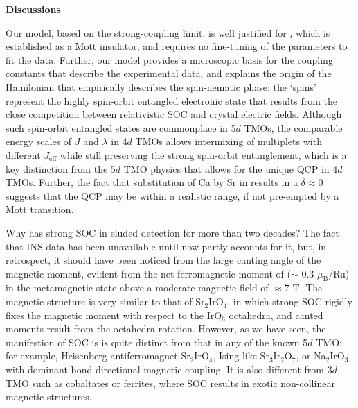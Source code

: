 \vspace{ 10 pt}
\noindent
{\bf Discussions}

\noindent
Our model, based on the strong-coupling limit, is well justified for \CROns, which is established as a Mott insulator, and requires no fine-tuning of the parameters to fit the data. Further, our model provides a microscopic basis for the coupling constants that describe the experimental data, and explains the origin of the Hamilonian that empirically describes the spin-nematic phase: the `spins' represent the highly spin-orbit entangled electronic state that results from the close competition between relativistic SOC and crystal electric fields. Although such spin-orbit entangled states are commonplace in 5$d$ TMOs, the comparable energy scales of $J$ and $\lambda$ in 4$d$ TMOs allows intermixing of multiplets with different $J_{\mathrm {eff}}$ while still preserving the strong spin-orbit entanglement, which is a key distinction from the 5$d$ TMO physics that allows for the unique QCP in 4$d$ TMOs. Further, the fact that substitution of Ca by Sr in \CRO results in a $\delta$$\approx$0 suggests that the QCP may be within a realistic range, if not pre-empted by a Mott transition.

Why has strong SOC in \CRO eluded detection for more than two decades? The fact that INS data has been unavailable until now partly accounts for it, but, in retrospect, it should have been noticed from the large canting angle of the magnetic moment, evident from the net ferromagnetic moment of ($\sim$ 0.3 $\mu_{\mathrm{B}}$/Ru) in the metamagnetic state above a moderate magnetic field of $\approx7$ T. The magnetic structure is very similar to that of Sr$_2$IrO$_4$, in which strong SOC rigidly fixes the magnetic moment with respect to the IrO$_6$ octahedra, and canted moments result from the octahedra rotation. However, as we have seen, the manifestion of SOC is \CRO is quite distinct from that in any of the known 5$d$ TMO; for example, Heisenberg antiferromagnet Sr$_2$IrO$_4$,  Ising-like Sr$_3$Ir$_2$O$_7$, or Na$_2$IrO$_3$ with dominant bond-directional magnetic coupling. It is also different from 3$d$ TMO such as cobaltates or ferrites, where SOC results in exotic non-collinear magnetic structures.
  
